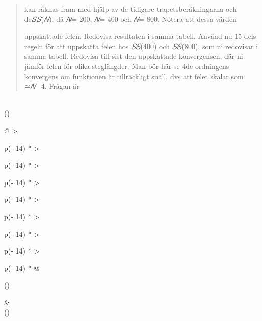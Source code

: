 \documentclass[
]{article}
\begin{document}
\begin{longtable}[]
{\begin{minipage}[t]{\linewidth}
\begin{quote}
kan räknas fram med hjälp av de tidigare trapetsberäkningarna och
de\emph{𝑆𝑆}(\emph{𝑁}), då \emph{𝑁}= 200, \emph{𝑁}= 400 och \emph{𝑁}=
800. Notera att dessa värden

uppskattade felen. Redovisa resultaten i samma tabell. Använd nu 15-dels
regeln för att uppskatta felen hos \emph{𝑆𝑆}(400) och \emph{𝑆𝑆}(800),
som ni redovisar i samma tabell. Redovisa till sist den uppskattade
konvergensen, där ni jämför felen för olika steglängder. Man bör här se
4de ordningens konvergens om funktionen är tillräckligt snäll, dvs att
felet skalar som ≃\emph{𝑁}−4. Frågan är
\end{quote}
\end{minipage}} \\
\bottomrule()
\end{longtable}

\begin{longtable}[]{@{}
  >{\raggedright\arraybackslash}p{(\columnwidth - 14\tabcolsep) * }
  >{\raggedright\arraybackslash}p{(\columnwidth - 14\tabcolsep) * }
  >{\raggedright\arraybackslash}p{(\columnwidth - 14\tabcolsep) * }
  >{\raggedright\arraybackslash}p{(\columnwidth - 14\tabcolsep) * }
  >{\raggedright\arraybackslash}p{(\columnwidth - 14\tabcolsep) * }
  >{\raggedright\arraybackslash}p{(\columnwidth - 14\tabcolsep) * }
  >{\raggedright\arraybackslash}p{(\columnwidth - 14\tabcolsep) * }
  >{\raggedright\arraybackslash}p{(\columnwidth - 14\tabcolsep) * }@{}}
\toprule()
\begin{minipage}[b]{\linewidth}\raggedright
\end{minipage} &
 \\
\midrule()
\endhead
{}
\end{longtable}
\end{document}
